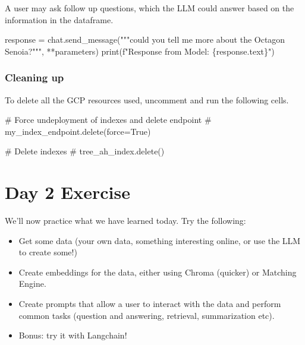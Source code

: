\documentclass[
  letterpaper,
  DIV=11,
  numbers=noendperiod]{scrreprt}
\newenvironment{Shaded}{\begin{snugshade}}{\end{snugshade}}
\newcommand{\BuiltInTok}[1]{\textcolor[rgb]{0.00,0.23,0.31}{#1}}
\newcommand{\CommentTok}[1]{\textcolor[rgb]{0.37,0.37,0.37}{#1}}
\newcommand{\NormalTok}[1]{\textcolor[rgb]{0.00,0.23,0.31}{#1}}
\newcommand{\OperatorTok}[1]{\textcolor[rgb]{0.37,0.37,0.37}{#1}}
\newcommand{\SpecialCharTok}[1]{\textcolor[rgb]{0.37,0.37,0.37}{#1}}
\newcommand{\SpecialStringTok}[1]{\textcolor[rgb]{0.13,0.47,0.30}{#1}}
\newcommand{\StringTok}[1]{\textcolor[rgb]{0.13,0.47,0.30}{#1}}
\begin{document}
A user may ask follow up questions, which the LLM could answer based on
the information in the dataframe.

\begin{Shaded}
\begin{Highlighting}[]
\NormalTok{response }\OperatorTok{=}\NormalTok{ chat.send\_message(}\StringTok{"""could you tell me more about the Octagon Senoia?"""}\NormalTok{, }\OperatorTok{**}\NormalTok{parameters)}
\BuiltInTok{print}\NormalTok{(}\SpecialStringTok{f"Response from Model: }\SpecialCharTok{\{}\NormalTok{response}\SpecialCharTok{.}\NormalTok{text}\SpecialCharTok{\}}\SpecialStringTok{"}\NormalTok{)}
\end{Highlighting}
\end{Shaded}

\hypertarget{cleaning-up}{%
\subsection{Cleaning up}\label{cleaning-up}}

To delete all the GCP resources used, uncomment and run the following
cells.

\begin{Shaded}
\begin{Highlighting}[]
\CommentTok{\# Force undeployment of indexes and delete endpoint}
\CommentTok{\# my\_index\_endpoint.delete(force=True)}
\end{Highlighting}
\end{Shaded}

\begin{Shaded}
\begin{Highlighting}[]
\CommentTok{\# Delete indexes}
\CommentTok{\# tree\_ah\_index.delete()}
\end{Highlighting}
\end{Shaded}


\hypertarget{day-2-exercise}{%
\chapter{Day 2 Exercise}\label{day-2-exercise}}

We'll now practice what we have learned today. Try the following:

\begin{itemize}
\item
  Get some data (your own data, something interesting online, or use the
  LLM to create some!)
\item
  Create embeddings for the data, either using Chroma (quicker) or
  Matching Engine.
\item
  Create prompts that allow a user to interact with the data and perform
  common tasks (question and answering, retrieval, summarization etc).
\item
  Bonus: try it with Langchain!
\end{itemize}
\end{document}
